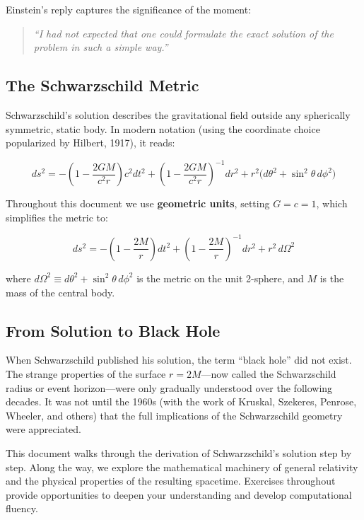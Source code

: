 \documentclass[12pt]{article}
\theoremstyle{definition}
\theoremstyle{remark}
\begin{document}
Einstein's reply captures the significance of the moment:

\begin{quote}
\itshape
``I had not expected that one could formulate the exact solution of the problem in such a simple way.''
\end{quote}

\subsection{The Schwarzschild Metric}

Schwarzschild's solution describes the gravitational field outside any spherically symmetric, static body. In modern notation (using the coordinate choice popularized by Hilbert, 1917), it reads:

\begin{equation}\label{eq:schwarzschild}
  ds^{2} = -\left(1 - \frac{2GM}{c^{2}r}\right)c^{2}dt^{2}
           + \left(1 - \frac{2GM}{c^{2}r}\right)^{-1}dr^{2}
           + r^{2}\big(d\theta^{2} + \sin^{2}\theta\,d\phi^{2}\big)
\end{equation}

Throughout this document we use \textbf{geometric units}, setting $G = c = 1$, which simplifies the metric to:

\begin{equation}\label{eq:schwarzschild-gu}
  ds^{2} = -\left(1 - \frac{2M}{r}\right)dt^{2}
           + \left(1 - \frac{2M}{r}\right)^{-1}dr^{2}
           + r^{2}\,d\Omega^{2}
\end{equation}

where $d\Omega^{2} \equiv d\theta^{2} + \sin^{2}\theta\,d\phi^{2}$ is the metric on the unit 2-sphere, and $M$ is the mass of the central body.

\subsection{From Solution to Black Hole}

When Schwarzschild published his solution, the term ``black hole'' did not exist. The strange properties of the surface $r = 2M$---now called the Schwarzschild radius or event horizon---were only gradually understood over the following decades. It was not until the 1960s (with the work of Kruskal, Szekeres, Penrose, Wheeler, and others) that the full implications of the Schwarzschild geometry were appreciated.

This document walks through the derivation of Schwarzschild's solution step by step. Along the way, we explore the mathematical machinery of general relativity and the physical properties of the resulting spacetime. Exercises throughout provide opportunities to deepen your understanding and develop computational fluency.
\end{document}
